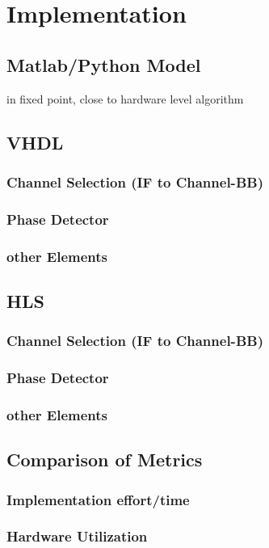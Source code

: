 \chapter{Implementation}
  \section{Matlab/Python Model}
  in fixed point, close to hardware level algorithm

  \section{VHDL}
    \subsection{Channel Selection (IF to Channel-BB)}
    \subsection{Phase Detector}
    \subsection{other Elements}

  \section{HLS}
    \subsection{Channel Selection (IF to Channel-BB)}
    \subsection{Phase Detector}
    \subsection{other Elements}

  \section{Comparison of Metrics}
    \subsection{Implementation effort/time}
    \subsection{Hardware Utilization}
